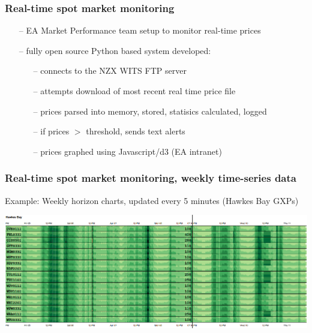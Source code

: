 \documentclass[aspectratio=169]{beamer}
\begin{document}
%

\begin{frame}[fragile]
  \frametitle{Real-time spot market monitoring}

\begin{itemize}
   \item[--] EA Market Performance team setup to monitor real-time prices
   \item[--] fully open source Python based system developed:
   \begin{itemize}
       \item[--] connects to the NZX WITS FTP server
       \item[--] attempts download of most recent real time price file 
       \item[--] prices parsed into memory, stored, statisics calculated, logged
       \item[--] if prices $>$ threshold, sends text alerts
       \item[--] prices graphed using Javascript/d3 (EA intranet)
       
   \end{itemize}
\end{itemize}

\end{frame}

\frame
{\frametitle{Real-time spot market monitoring, weekly time-series data}

Example: Weekly horizon charts, updated every 5 minutes (Hawkes Bay GXPs)
\begin{center}
\includegraphics[width=14.5cm]{./notebooks/rtpm2.png} 
\end{center}
}
\end{document}
